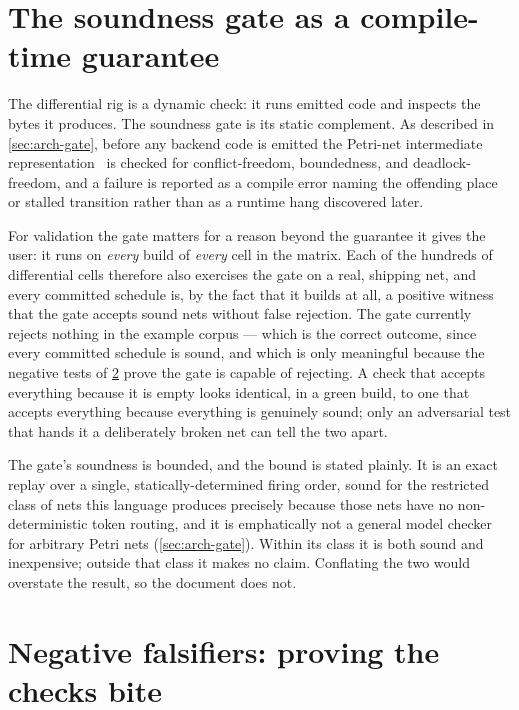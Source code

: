 \section{The soundness gate as a compile-time guarantee}\label{sec:val-gate}

The differential rig is a dynamic check: it runs emitted code and inspects the
bytes it produces. The soundness gate is its static complement. As described in
\cref{sec:arch-gate}, before any backend code is emitted the Petri-net
intermediate representation~\cite{murata1989petri} is checked for conflict-freedom,
boundedness, and deadlock-freedom, and a failure is reported as a compile error
naming the offending place or stalled transition rather than as a runtime hang
discovered later.

For validation the gate matters for a reason beyond the guarantee it gives the
user: it runs on \emph{every} build of \emph{every} cell in the matrix. Each of
the hundreds of differential cells therefore also exercises the gate on a real,
shipping net, and every committed schedule is, by the fact that it builds at all,
a positive witness that the gate accepts sound nets without false rejection. The
gate currently rejects nothing in the example corpus --- which is the correct
outcome, since every committed schedule is sound, and which is only meaningful
because the negative tests of \cref{sec:val-negative} prove the gate is capable of
rejecting. A check that accepts everything because it is empty looks identical, in
a green build, to one that accepts everything because everything is genuinely
sound; only an adversarial test that hands it a deliberately broken net can tell
the two apart.

The gate's soundness is bounded, and the bound is stated plainly. It is an exact
replay over a single, statically-determined firing order, sound for the restricted
class of nets this language produces precisely because those nets have no
non-deterministic token routing, and it is emphatically not a general model checker
for arbitrary Petri nets (\cref{sec:arch-gate}). Within its class it is both sound
and inexpensive; outside that class it makes no claim. Conflating the two would
overstate the result, so the document does not.

\section{Negative falsifiers: proving the checks bite}\label{sec:val-negative}

